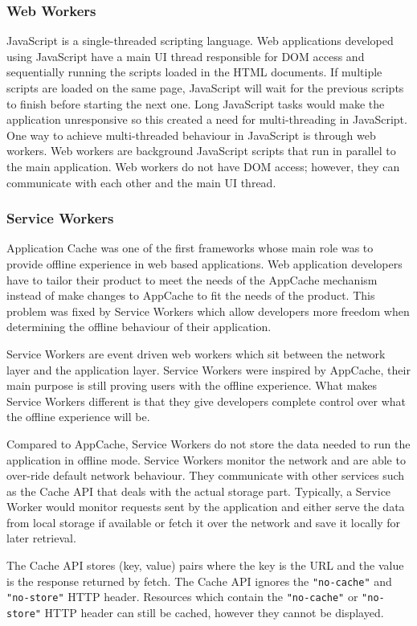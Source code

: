 \documentclass[10pt,a4paper,twoside]{book}
\begin{document}
\subsubsection{Web Workers}
JavaScript is a single-threaded scripting language. Web applications developed using JavaScript have a main UI thread responsible for DOM access and sequentially running the scripts loaded in the HTML documents. If multiple scripts are loaded on the same page, JavaScript will wait for the previous scripts to finish before starting the next one. Long JavaScript tasks would make the application unresponsive so this created a need for multi-threading in JavaScript. One way to achieve multi-threaded behaviour in JavaScript is through web workers. Web workers are background JavaScript scripts that run in parallel to the main application. Web workers do not have DOM access; however, they can communicate with each other and the main UI thread.

\subsubsection{Service Workers}
Application Cache was one of the first frameworks whose main role was to provide offline experience in web based applications. Web application developers have to tailor their product to meet the needs of the AppCache mechanism instead of make changes to AppCache to fit the needs of the product. This problem was fixed by Service Workers which allow developers more freedom when determining the offline behaviour of their application.

Service Workers are event driven web workers which sit between the network layer and the application layer. Service Workers were inspired by AppCache, their main purpose is still proving users with the offline experience. What makes Service Workers different is that they give developers complete control over what the offline experience will be. 

Compared to AppCache, Service Workers do not store the data needed to run the application in offline mode. Service Workers monitor the network and are able to over-ride default network behaviour. They communicate with other services such as the Cache API that deals with the actual storage part. Typically, a Service Worker would monitor requests sent by the application and either serve the data from local storage if available or fetch it over the network and save it locally for later retrieval. 

The Cache API stores (key, value) pairs where the key is the URL and the value is the response returned by fetch. The Cache API ignores the \texttt{"no-cache"} and \texttt{"no-store"} HTTP header. Resources which contain the \texttt{"no-cache"} or \texttt{"no-store"} HTTP header can still be cached, however they cannot be displayed. 
\end{document}
